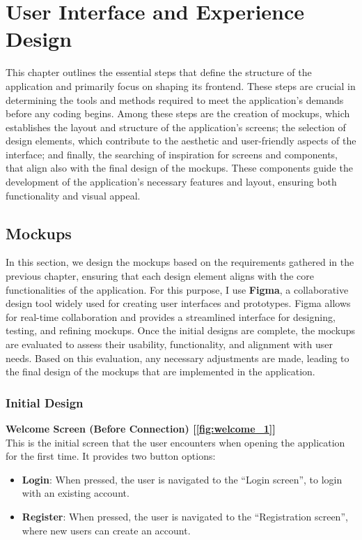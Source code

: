 \chapter{User Interface and Experience Design}

This chapter outlines the essential steps that define the structure of the application and primarily focus on shaping its frontend. These steps are crucial in determining the tools and methods required to meet the application's demands before any coding begins. Among these steps are the creation of mockups, which establishes the layout and structure of the application's screens; the selection of design elements, which contribute to the aesthetic and user-friendly aspects of the interface; and finally, the searching of inspiration for screens and components, that align also with the final design of the mockups. These components guide the development of the application's necessary features and layout, ensuring both functionality and visual appeal.

\section{Mockups}

In this section, we design the mockups based on the requirements gathered in the previous chapter, ensuring that each design element aligns with the core functionalities of the application. For this purpose, I use \textbf{Figma}, a collaborative design tool widely used for creating user interfaces and prototypes. Figma allows for real-time collaboration and provides a streamlined interface for designing, testing, and refining mockups. Once the initial designs are complete, the mockups are evaluated to assess their usability, functionality, and alignment with user needs. Based on this evaluation, any necessary adjustments are made, leading to the final design of the mockups that are implemented in the application.

\subsection{Initial Design}

\noindent \textbf{Welcome Screen (Before Connection) [\ref{fig:welcome_1}]} \\
This is the initial screen that the user encounters when opening the application for the first time. It provides two button options:

\begin{itemize}
    \item \textbf{Login}: When pressed, the user is navigated to the ``Login screen'', to login with an existing account.
    \item \textbf{Register}: When pressed, the user is navigated to the ``Registration screen'', where new users can create an account.
\end{itemize}

